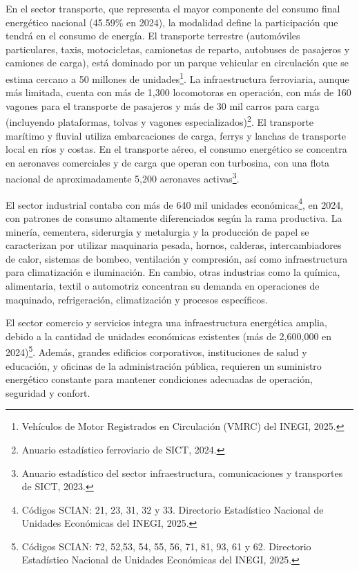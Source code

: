 \documentclass{sener2025}
\begin{document}
En el sector transporte, que representa el mayor componente del consumo final energético nacional (45.59\% en 2024), la modalidad define la participación que tendrá en el consumo de energía. El transporte terrestre (automóviles particulares, taxis, motocicletas, camionetas de reparto, autobuses de pasajeros y camiones de carga), está dominado por un parque vehicular en circulación que se estima cercano a 50 millones de unidades\footnote{Vehículos de Motor Registrados en Circulación (VMRC) del INEGI, 2025.}. La infraestructura ferroviaria, aunque más limitada, cuenta con más de 1,300 locomotoras en operación, con más de 160 vagones para el transporte de pasajeros y más de 30 mil carros para carga (incluyendo plataformas, tolvas y vagones especializados)\footnote{Anuario estadístico ferroviario de SICT, 2024.}. El transporte marítimo y fluvial utiliza embarcaciones de carga, ferrys y lanchas de transporte local en ríos y costas. En el transporte aéreo, el consumo energético se concentra en aeronaves comerciales y de carga que operan con turbosina, con una flota nacional de aproximadamente 5,200 aeronaves activas\footnote{Anuario estadístico del sector infraestructura, comunicaciones y transportes de SICT, 2023.}.

El sector industrial contaba con más de 640 mil unidades económicas\footnote{Códigos SCIAN: 21, 23, 31, 32 y 33. Directorio Estadístico Nacional de Unidades Económicas del INEGI, 2025.}, en 2024, con patrones de consumo altamente diferenciados según la rama productiva. La minería, cementera, siderurgia y metalurgia y la producción de papel se caracterizan por utilizar maquinaria pesada, hornos, calderas, intercambiadores de calor, sistemas de bombeo, ventilación y compresión, así como infraestructura para climatización e iluminación. En cambio, otras industrias como la química, alimentaria, textil o automotriz concentran su demanda en operaciones de maquinado, refrigeración, climatización y procesos específicos.

El sector comercio y servicios integra una infraestructura energética amplia, debido a la cantidad de unidades económicas existentes (más de 2,600,000 en 2024)\footnote{Códigos SCIAN: 72, 52,53, 54, 55, 56, 71, 81, 93, 61 y 62. Directorio Estadístico Nacional de Unidades Económicas del INEGI, 2025.}. Además, grandes edificios corporativos, instituciones de salud y educación, y oficinas de la administración pública, requieren un suministro energético constante para mantener condiciones adecuadas de operación, seguridad y confort.
\end{document}
